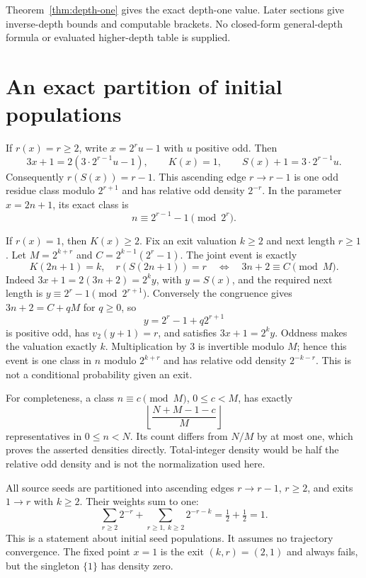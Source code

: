 \documentclass[11pt,letterpaper]{article}
\begin{document}
Theorem~\ref{thm:depth-one} gives the exact depth-one value. Later sections
give inverse-depth bounds and computable brackets. No closed-form
general-depth formula or evaluated higher-depth table is supplied.

\section{An exact partition of initial populations}
If $r(x)=r\ge2$, write $x=2^ru-1$ with $u$ positive odd. Then
\[
 3x+1=2(3\cdot2^{r-1}u-1),\qquad
 K(x)=1,\qquad S(x)+1=3\cdot2^{r-1}u.
\]
Consequently $r(S(x))=r-1$. This ascending edge $r\to r-1$ is one odd
residue class modulo $2^{r+1}$ and has relative odd density $2^{-r}$.
In the parameter $x=2n+1$, its exact class is
\begin{equation}\label{eq:ascending-class}
 n\equiv2^{r-1}-1\pmod{2^r}.
\end{equation}

If $r(x)=1$, then $K(x)\ge2$. Fix an exit valuation $k\ge2$ and next length
$r\ge1$. Let $M=2^{k+r}$ and $C=2^{k-1}(2^r-1)$. The joint event is exactly
\begin{equation}\label{eq:exit-class}
 K(2n+1)=k,\quad r(S(2n+1))=r
 \quad\Longleftrightarrow\quad 3n+2\equiv C\pmod M.
\end{equation}
Indeed $3x+1=2(3n+2)=2^k y$, with $y=S(x)$, and the required next length is
$y\equiv2^r-1\pmod{2^{r+1}}$. Conversely the congruence gives
$3n+2=C+qM$ for $q\ge0$, so
\[
 y=2^r-1+q2^{r+1}
\]
is positive odd, has $v_2(y+1)=r$, and satisfies $3x+1=2^ky$. Oddness makes
the valuation exactly $k$. Multiplication by $3$ is invertible modulo $M$;
hence this event is one class in $n$ modulo $2^{k+r}$ and has relative odd
density $2^{-k-r}$. This is not a conditional probability given an exit.

For completeness, a class $n\equiv c\pmod M$, $0\le c<M$, has exactly
\[
 \left\lfloor\frac{N+M-1-c}{M}\right\rfloor
\]
representatives in $0\le n<N$. Its count differs from $N/M$ by at most one,
which proves the asserted densities directly. Total-integer density would
be half the relative odd density and is not the normalization used here.

All source seeds are partitioned into ascending edges $r\to r-1$,
$r\ge2$, and exits $1\to r$ with $k\ge2$. Their weights sum to one:
\[
 \sum_{r\ge2}2^{-r}+\sum_{r\ge1,\ k\ge2}2^{-r-k}
 =\tfrac12+\tfrac12=1.
\]
This is a statement about initial seed populations. It assumes no trajectory
convergence. The fixed point $x=1$ is the exit $(k,r)=(2,1)$ and always fails,
but the singleton $\{1\}$ has density zero.
\end{document}

